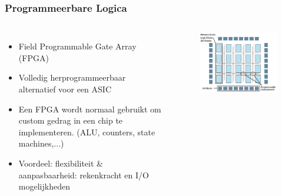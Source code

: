 \documentclass{beamer}
\begin{document}
\begin{frame} 
\frametitle{Programmeerbare Logica}
\begin{columns}[c] 
  \begin{itemize}[<+->]
    \item Field Programmable Gate Array (FPGA)
    \item Volledig herprogrammeerbaar alternatief voor een ASIC
    \item Een FPGA wordt normaal gebruikt om custom gedrag in een chip te implementeren. (ALU, counters, state machines,...)
    \item Voordeel: flexibiliteit \& aanpasbaarheid: rekenkracht en I/O mogelijkheden
  \end{itemize}
  \begin{figure}[h]
  \includegraphics[width=0.99\textwidth]{images/fpga.png}
  \end{figure}
\end{columns}
\end{frame}

\end{document}
